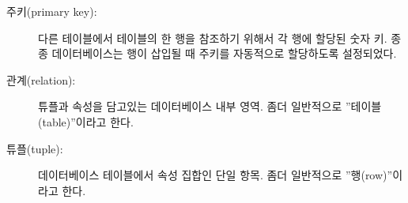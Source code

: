 \begin{description}
\item[주키(primary key):]
다른 테이블에서 테이블의 한 행을 참조하기 위해서 각 행에 할당된 숫자 키.
종종 데이터베이스는 행이 삽입될 때 주키를 자동적으로 할당하도록 설정되었다.

\item[관계(relation):]
튜플과 속성을 담고있는 데이터베이스 내부 영역. 좀더 일반적으로 ''테이블(table)''이라고 한다.

\item[튜플(tuple):]
데이터베이스 테이블에서 속성 집합인 단일 항목. 좀더 일반적으로 ''행(row)''이라고 한다.

\end{description}

